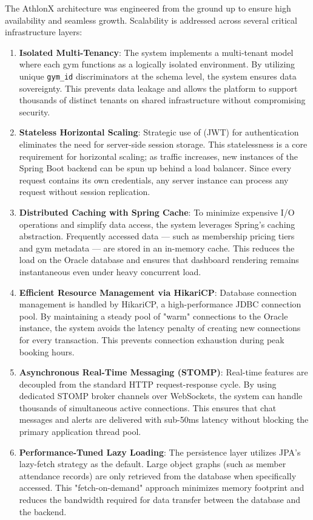 \documentclass[
  12pt,
  a4paperpaper,
]{report}
\begin{document}
The AthlonX architecture was engineered from the ground up to ensure high availability and seamless growth. Scalability is addressed across several critical infrastructure layers:

\begin{enumerate}
    \item \textbf{Isolated Multi-Tenancy}: The system implements a multi-tenant model where each gym functions as a logically isolated environment. By utilizing unique \texttt{gym\_id} discriminators at the schema level, the system ensures data sovereignty. This prevents data leakage and allows the platform to support thousands of distinct tenants on shared infrastructure without compromising security.
    
    \item \textbf{Stateless Horizontal Scaling}: Strategic use of (JWT) for authentication eliminates the need for server-side session storage. This statelessness is a core requirement for horizontal scaling; as traffic increases, new instances of the Spring Boot backend can be spun up behind a load balancer. Since every request contains its own credentials, any server instance can process any request without session replication.
    
    \item \textbf{Distributed Caching with Spring Cache}: To minimize expensive I/O operations and simplify data access, the system leverages Spring's caching abstraction. Frequently accessed data --- such as membership pricing tiers and gym metadata --- are stored in an in-memory cache. This reduces the load on the Oracle database and ensures that dashboard rendering remains instantaneous even under heavy concurrent load.
    
    \item \textbf{Efficient Resource Management via HikariCP}: Database connection management is handled by HikariCP, a high-performance JDBC connection pool. By maintaining a steady pool of "warm" connections to the Oracle instance, the system avoids the latency penalty of creating new connections for every transaction. This prevents connection exhaustion during peak booking hours.
    
    \item \textbf{Asynchronous Real-Time Messaging (STOMP)}: Real-time features are decoupled from the standard HTTP request-response cycle. By using dedicated STOMP broker channels over WebSockets, the system can handle thousands of simultaneous active connections. This ensures that chat messages and alerts are delivered with sub-50ms latency without blocking the primary application thread pool.
    
    \item \textbf{Performance-Tuned Lazy Loading}: The persistence layer utilizes JPA's lazy-fetch strategy as the default. Large object graphs (such as member attendance records) are only retrieved from the database when specifically accessed. This "fetch-on-demand" approach minimizes memory footprint and reduces the bandwidth required for data transfer between the database and the backend.
\end{enumerate}
\end{document}
